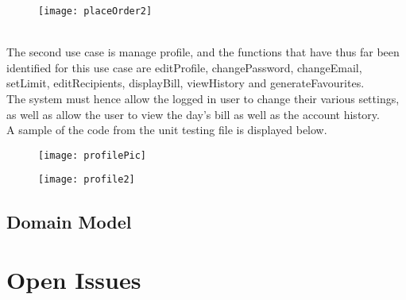 \documentclass[12pt]{article}
\begin{document}
\begin{figure}[h!]
  \centering
    \texttt{[image: placeOrder2]} 
\end{figure}
\\
The second use case is manage profile, and the functions that have thus far been identified for this use case are editProfile, changePassword, changeEmail, setLimit, editRecipients, displayBill, viewHistory and generateFavourites. 
\\
The system must hence allow the logged in user to change their various settings, as well as allow the user to view the day's bill as well as the account history.
\\
A sample of the code from the unit testing file is displayed below.
\begin{figure}[h!]
  \centering
    \texttt{[image: profilePic]} 
\end{figure}
\begin{figure}[h!]
  \centering
    \texttt{[image: profile2]} 
\end{figure}

\subsection{Domain Model}


\section{Open Issues}
\end{document}
